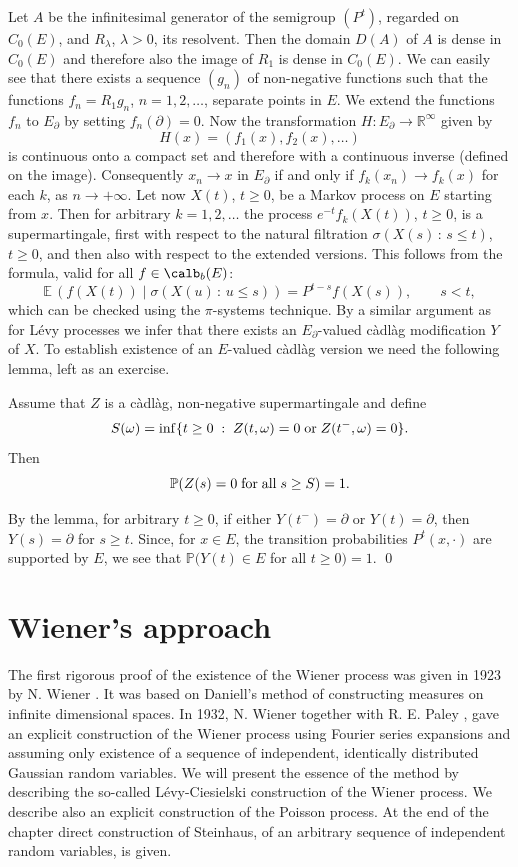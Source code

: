 \documentclass[preprint]{imsart}
\def\P{\mathbb P}
\def\E{\mathbb E}
\def\R{\mathbb R}
\begin{document}
{
Let $A$ be the infinitesimal generator of the semigroup $(P^t)$,
regarded on $C_0(E)$, and $R_\lambda$, $\lambda>0$, its resolvent.
Then the domain $D(A)$ of $A$ is dense in $C_0(E)$ and therefore
also the image of $R_1$ is dense in $C_0(E)$. We can easily see
that there exists a sequence $(g_n)$ of non-negative functions
such that the functions $f_n=R_1g_n$, $n=1,2,\ldots$, separate
points in $E$. We extend the functions $f_n$ to $E_\partial$ by
setting $f_n(\partial)=0$. Now the transformation $H:E_\partial\to
\R^\infty$ given by
$$
H(x)=(f_1(x), f_2(x),\ldots )
$$
is continuous onto a compact set and therefore with a continuous
inverse (defined on the image). Consequently $x_n\to x$ in
$E_\partial$ if and only if $f_k(x_n)\to f_k(x)$ for each $k$, as
$n\to+\infty$. Let now $X(t)$, $t\ge0$, be a Markov process
on $E$ starting from $x$. Then for arbitrary $k=1,2,\ldots$ the
process $e^{-t}f_k(X(t))$, $t\ge0$, is a supermartingale, first
with respect to the natural filtration $\sigma (X(s)\,:\,s\le t)$,
$t\ge0$, and then also with respect to the extended versions.
This follows from the formula, valid for all $f\in\calb_b(E)$:
$$
\E\, (f(X(t))\;|\; \sigma (X(u)\,:\,u\le s))
=P^{t-s}f(X(s)),
\qquad s<t,
$$
which can be checked using the $\pi$-systems technique.
By a similar argument as for  L\'evy processes we infer that there
exists an $E_\partial$-valued c\`adl\`ag modification $Y$ of $X$.
To establish existence of an
$E$-valued c\`adl\`ag version we need the following lemma, left as
an exercise.

\begin{Lemma}\label{supermartpos}
  Assume that $Z$ is a c\`adl\`ag, non-negative supermartingale
  and define
  $$
  S(\omega)= \inf\{t\ge 0\;:\; Z(t, \omega )=0\;{\rm or \;} Z(t^-, \omega)=0\}.
  $$
Then
$$
\P(Z(s)=0 {\rm \; for \;all\;} s\ge S)=1.
$$
\end{Lemma}

By the lemma, for arbitrary $t\ge 0$, if either $Y(t^-)=\partial$
or $Y(t)=\partial$, then $Y(s)=\partial$ for $s\ge t$. Since, for
$x\in E$, the transition probabilities $P^t(x,\cdot)$ are
supported by $E$, we see that $\P( Y(t)\in E $ for all $t\geq
0)=1$.
\qed

\chapter{Wiener's approach}

The first rigorous proof of the existence of the Wiener process
was given in 1923 by N. Wiener \cite{bib7}. It was
based on Daniell's method \cite{bib8} of constructing measures on infinite dimensional spaces.
In 1932, N. Wiener together with R. E. Paley \cite{bib9}, gave an explicit construction
of the Wiener process using  Fourier series expansions and assuming only
existence of a sequence of independent, identically distributed
Gaussian random variables. We will present the essence of the method by
describing the so-called L\'evy-Ciesielski construction of the Wiener
process. We describe  also an explicit construction of the Poisson process. At the end of the chapter
direct construction of Steinhaus, of an arbitrary sequence of independent random variables, is given.


}
\end{document}
